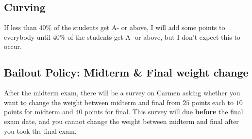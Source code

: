 \documentclass[12pt]{article}
\begin{document}


\subsection*{Curving}

If less than $40\%$ of the students get A- or above, I will add some points to everybody until $40\%$ of the students get A- or above, but I don’t expect this to occur.

\subsection*{Bailout Policy: Midterm \& Final weight change}
\label{sub:Bailout_Policy__Midterm____Final_weight_change}

After the midterm exam, there will be a survey on Carmen asking whether you want to change the weight between midterm and final from $ 25 $ points each to $ 10 $ points for midterm and $ 40  $ points for final.
This survey will due \textbf{before} the final exam date, and you cannot change the weight between midterm and final after you took the final exam.


\newpage



\end{document}
